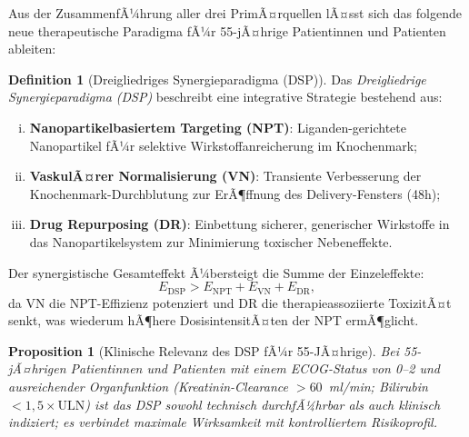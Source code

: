 ﻿\documentclass[12pt,a4paper]{article}
\newtheorem{proposition}[theorem]{Proposition}
\theoremstyle{definition}
\newtheorem{definition}[theorem]{Definition}
\begin{document}
Aus der ZusammenfÃ¼hrung aller drei PrimÃ¤rquellen lÃ¤sst sich das folgende neue
therapeutische Paradigma fÃ¼r 55-jÃ¤hrige Patientinnen und Patienten ableiten:

\begin{definition}[Dreigliedriges Synergieparadigma (DSP)]
  Das \emph{Dreigliedrige Synergieparadigma (DSP)} beschreibt eine integrative
  Strategie bestehend aus:
  \begin{enumerate}[(i)]
    \item \textbf{Nanopartikelbasiertem Targeting (NPT)}: Liganden-gerichtete
          Nanopartikel fÃ¼r selektive Wirkstoffanreicherung im Knochenmark;
    \item \textbf{VaskulÃ¤rer Normalisierung (VN)}: Transiente Verbesserung der
          Knochenmark-Durchblutung zur ErÃ¶ffnung des Delivery-Fensters (48h);
    \item \textbf{Drug Repurposing (DR)}: Einbettung sicherer, generischer
          Wirkstoffe in das Nanopartikelsystem zur Minimierung toxischer
          Nebeneffekte.
  \end{enumerate}
  Der synergistische Gesamteffekt Ã¼bersteigt die Summe der Einzeleffekte:
  \begin{equation}
    E_{\mathrm{DSP}} > E_{\mathrm{NPT}} + E_{\mathrm{VN}} + E_{\mathrm{DR}},
    \label{eq:synergy}
  \end{equation}
  da VN die NPT-Effizienz potenziert und DR die therapieassoziierte ToxizitÃ¤t
  senkt, was wiederum hÃ¶here DosisintensitÃ¤ten der NPT ermÃ¶glicht.
\end{definition}

\begin{proposition}[Klinische Relevanz des DSP fÃ¼r 55-JÃ¤hrige]
  Bei 55-jÃ¤hrigen Patientinnen und Patienten mit einem ECOG-Status von 0--2 und
  ausreichender Organfunktion (Kreatinin-Clearance $>60$~ml/min; Bilirubin
  $<1{,}5 \times \mathrm{ULN}$) ist das DSP sowohl technisch durchfÃ¼hrbar als auch
  klinisch indiziert; es verbindet maximale Wirksamkeit mit kontrolliertem
  Risikoprofil.
\end{proposition}
\end{document}
